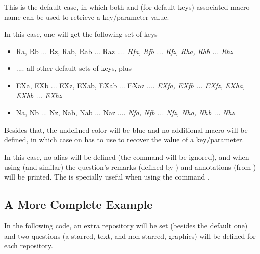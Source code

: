 \documentclass[10pt]{article}
\begin{document}
This is the default case, in which both \tsobj{\QuestVal} and (for default keys) associated macro name can be used to retrieve a key/parameter value.

\begin{codestore}
\usepackage[xtrakeys={EX,N},xtraidx={f,h},undef color={blue},no defs]{tikzquests}
\end{codestore}


In this case, one will get the following set of keys

\begin{itemize}[nosep]
\item Ra, Rb ... Rz, Rab, Rab ... Raz .... \emph{Rfa, Rfb ... Rfz, Rha, Rhb ... Rhz}
\item .... all other default sets of keys, plus
\item EXa, EXb ... EXz, EXab, EXab ... EXaz .... \emph{EXfa, EXfb ... EXfz, EXha, EXhb ... EXhz}
\item Na, Nb ... Nz, Nab, Nab ... Naz .... \emph{Nfa, Nfb ... Nfz, Nha, Nhb ... Nhz}
\end{itemize}

Besides that, the undefined color will be blue and no additional macro will be defined, in which case on has to use \tsobj{\QuestVal} to recover the value of a key/parameter.

\begin{codestore}
\usepackage[no alias, in review]{tikzquests}
\end{codestore}

In this case, no alias will be defined (the command  will be ignored), and when using \tsobj{\tikzQuestion} (and similar) the question's remarks (defined by ) and annotations (from \tsobj{\tikzQuestion}) will be printed. The  is specially useful when using the command \tsobj{\QuestionsList}.

\subsection{A More Complete Example}
In the following code, an extra repository will be set (besides the default one) and two questions (a starred, text, and non starred, graphics) will be defined for each repository.
\end{document}
